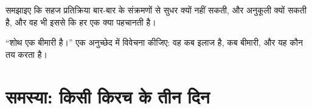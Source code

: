 \begin{exercise}[$\star\star\star$]\label{exo:g12:innate-immunity:14}
समझाइए कि सहज प्रतिक्रिया बार-बार के संक्रमणों से सुधर क्यों नहीं सकती, और
अनुकूली क्यों सकती है, और वह भी इससे कि हर एक क्या पहचानती है।
\end{exercise}

\begin{exercise}[$\star\star\star$]\label{exo:g12:innate-immunity:15}
``शोथ एक बीमारी है।'' एक अनुच्छेद में विवेचना कीजिए: वह कब इलाज है, कब
बीमारी, और यह कौन तय करता है।
\end{exercise}

\section{समस्या: किसी किरच के तीन दिन}

